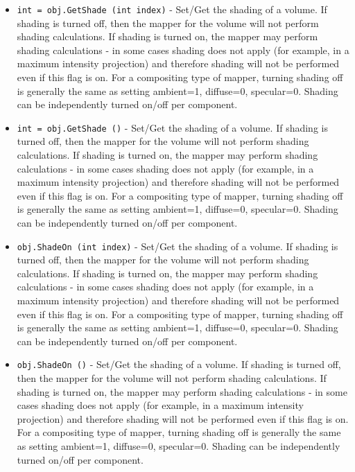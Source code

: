 \begin{itemize}
\item  \verb|int = obj.GetShade (int index)| -  Set/Get the shading of a volume. If shading is turned off, then
 the mapper for the volume will not perform shading calculations.
 If shading is turned on, the mapper may perform shading 
 calculations - in some cases shading does not apply (for example,
 in a maximum intensity projection) and therefore shading will
 not be performed even if this flag is on. For a compositing type
 of mapper, turning shading off is generally the same as setting
 ambient=1, diffuse=0, specular=0. Shading can be independently
 turned on/off per component.

\item  \verb|int = obj.GetShade ()| -  Set/Get the shading of a volume. If shading is turned off, then
 the mapper for the volume will not perform shading calculations.
 If shading is turned on, the mapper may perform shading 
 calculations - in some cases shading does not apply (for example,
 in a maximum intensity projection) and therefore shading will
 not be performed even if this flag is on. For a compositing type
 of mapper, turning shading off is generally the same as setting
 ambient=1, diffuse=0, specular=0. Shading can be independently
 turned on/off per component.

\item  \verb|obj.ShadeOn (int index)| -  Set/Get the shading of a volume. If shading is turned off, then
 the mapper for the volume will not perform shading calculations.
 If shading is turned on, the mapper may perform shading 
 calculations - in some cases shading does not apply (for example,
 in a maximum intensity projection) and therefore shading will
 not be performed even if this flag is on. For a compositing type
 of mapper, turning shading off is generally the same as setting
 ambient=1, diffuse=0, specular=0. Shading can be independently
 turned on/off per component.

\item  \verb|obj.ShadeOn ()| -  Set/Get the shading of a volume. If shading is turned off, then
 the mapper for the volume will not perform shading calculations.
 If shading is turned on, the mapper may perform shading 
 calculations - in some cases shading does not apply (for example,
 in a maximum intensity projection) and therefore shading will
 not be performed even if this flag is on. For a compositing type
 of mapper, turning shading off is generally the same as setting
 ambient=1, diffuse=0, specular=0. Shading can be independently
 turned on/off per component.


\end{itemize}
